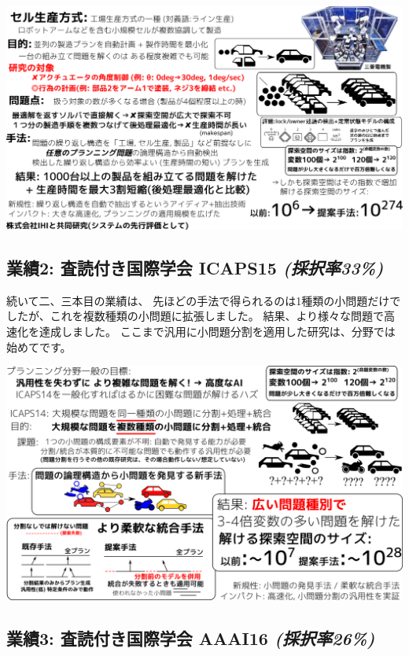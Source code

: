 \includegraphics{img/assemble-icaps14.png}

\subsection{業績2: 査読付き国際学会 ICAPS15 \textbf{\emph{(採択率33\%)}}}
\label{sec-1-7}

\begin{resume}
続いて二、三本目の業績は、
先ほどの手法で得られるのは1種類の小問題だけでしたが、これを複数種類の小問題に拡張しました。
結果、より様々な問題で高速化を達成しました。
ここまで汎用に小問題分割を適用した研究は、分野では始めてです。
\end{resume}

\includegraphics{img/assemble-keps14-icaps15.png}

\subsection{業績3: 査読付き国際学会 AAAI16 \textbf{\emph{(採択率26\%)}}}
\label{sec-1-8}

